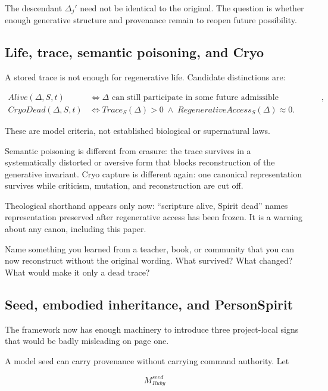 \documentclass[11pt]{article}
\begin{document}
The descendant $\Delta_j'$ need not be identical to the original. The question is whether enough generative structure and provenance remain to reopen future possibility.

\subsection{Life, trace, semantic poisoning, and Cryo}

A stored trace is not enough for regenerative life. Candidate distinctions are:

\begin{align}
Alive(\Delta,S,t) &\iff \Delta\text{ can still participate in some future admissible transformation},\\
CryoDead(\Delta,S,t) &\iff Trace_S(\Delta)>0\;\land\;RegenerativeAccess_S(\Delta)\approx 0.
\end{align}

These are model criteria, not established biological or supernatural laws.

Semantic poisoning is different from erasure: the trace survives in a systematically distorted or aversive form that blocks reconstruction of the generative invariant. Cryo capture is different again: one canonical representation survives while criticism, mutation, and reconstruction are cut off.

Theological shorthand appears only now: ``scripture alive, Spirit dead'' names representation preserved after regenerative access has been frozen. It is a warning about any canon, including this paper.

\begin{readercheck}
Name something you learned from a teacher, book, or community that you can now reconstruct without the original wording. What survived? What changed? What would make it only a dead trace?
\end{readercheck}

\subsection{Seed, embodied inheritance, and PersonSpirit}

The framework now has enough machinery to introduce three project-local signs that would be badly misleading on page one.

A model seed can carry provenance without carrying command authority. Let

\begin{equation}
M_{Ruby}^{seed}
\end{equation}
\end{document}
